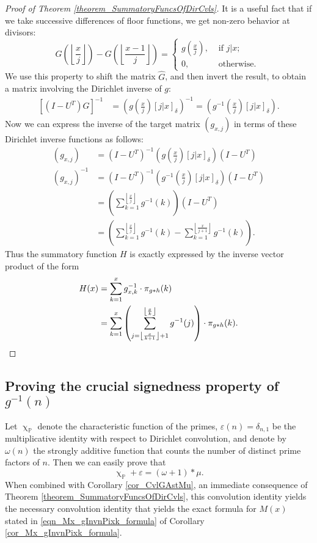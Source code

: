 \documentclass[11pt,reqno,a4letter]{article}
\numberwithin{figure}{section}
\numberwithin{table}{section}
\newcommand{\Iverson}[1]{\ensuremath{\left[#1\right]_{\delta}}}
\newcommand{\floor}[1]{\left\lfloor #1 \right\rfloor}
\renewcommand{\chi}{\upchi}
\theoremstyle{plain}
\numberwithin{theorem}{section}
\theoremstyle{definition}
\begin{document}
\begin{proof}[Proof of Theorem \ref{theorem_SummatoryFuncsOfDirCvls}]
It is a useful fact that if we take successive differences of floor functions, we get non-zero behavior at divisors: 
\[
G\left(\floor{\frac{x}{j}}\right) - G\left(\floor{\frac{x-1}{j}}\right) = 
     \begin{cases} 
     g\left(\frac{x}{j}\right), & \text{ if $j | x$; } \\ 
     0, & \text{ otherwise. } 
     \end{cases}
\]
We use this property to shift the matrix $\hat{G}$, and then invert the result, to obtain a matrix involving the 
Dirichlet inverse of $g$: 
\begin{align*} 
\left[(I-U^{T}) \hat{G}\right]^{-1} & = \left(g\left(\frac{x}{j}\right) \Iverson{j|x}\right)^{-1} = 
     \left(g^{-1}\left(\frac{x}{j}\right) \Iverson{j|x}\right). 
\end{align*} 
Now we can express the inverse of the target matrix $(g_{x,j})$ in terms of these Dirichlet inverse functions 
as follows: 
\begin{align*} 
(g_{x,j}) & = (I-U^{T})^{-1} \left(g\left(\frac{x}{j}\right) \Iverson{j|x}\right) (I-U^{T}) \\ 
(g_{x,j})^{-1} & = (I-U^{T})^{-1} \left(g^{-1}\left(\frac{x}{j}\right) \Iverson{j|x}\right) (I-U^{T}) \\ 
     & = \left(\sum_{k=1}^{\floor{\frac{x}{j}}} g^{-1}(k)\right) (I-U^{T}) \\ 
     & = \left(\sum_{k=1}^{\floor{\frac{x}{j}}} g^{-1}(k) - \sum_{k=1}^{\floor{\frac{x}{j+1}}} g^{-1}(k)\right). 
\end{align*} 
Thus the summatory function $H$ is exactly expressed by the inverse vector product of the form 
\begin{align*} 
H(x) & = \sum_{k=1}^x g_{x,k}^{-1} \cdot \pi_{g \ast h}(k) \\ 
     & = \sum_{k=1}^x \left(\sum_{j=\floor{\frac{x}{k+1}}+1}^{\floor{\frac{x}{k}}} g^{-1}(j)\right) \cdot \pi_{g \ast h}(k). 
     \qedhere
\end{align*} 
\end{proof} 

\subsection{Proving the crucial signedness property of $g^{-1}(n)$} 

Let $\chi_{\mathbb{P}}$ denote the characteristic function of the primes, 
$\varepsilon(n) = \delta_{n,1}$ be the multiplicative identity with respect to Dirichlet convolution, 
and denote by $\omega(n)$ the strongly additive function that counts the number of 
distinct prime factors of $n$. Then we can easily prove that 
\begin{equation}
\label{eqn_AntiqueDivisorSumIdent} 
\chi_{\mathbb{P}} + \varepsilon = (\omega + 1) \ast \mu. 
\end{equation} 
When combined with Corollary \ref{cor_CvlGAstMu}, an immediate consequence of 
Theorem \ref{theorem_SummatoryFuncsOfDirCvls}, 
this convolution identity yields the necessary convolution identity that yields the exact 
formula for $M(x)$ stated in \eqref{eqn_Mx_gInvnPixk_formula} of 
Corollary \ref{cor_Mx_gInvnPixk_formula}. 
\end{document}
